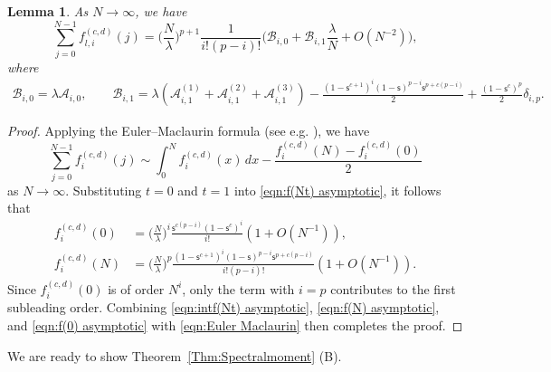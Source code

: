 \documentclass{amsart}
\theoremstyle{plain}
\newtheorem{lem}[thm]{Lemma}
\theoremstyle{remark}
\numberwithin{equation}{section}
\begin{document}
\begin{lem}\label{lem:asymptotic of sum f_{l,i}}
    As $N\rightarrow\infty$, we have
    \begin{equation}
        \sum_{j=0}^{N-1}f_{l,i}^{(c,d)}(j)
        =\Big(\frac{N}{\lambda}\Big)^{p+1}\frac{1}{i!(p-i)!}\Big(\mathcal {B}_{i,0}+\mathcal{B}_{i,1}\frac{\lambda}{N}+O(N^{-2})\Big), 
    \end{equation}
    where 
     \begin{align} \label{def of mathcal Bi01}
        \mathcal{B}_{i,0}=\lambda\mathcal{A}_{i,0},\qquad 
\mathcal{B}_{i,1}=\lambda(\mathcal{A}_{i,1}^{(1)}+\mathcal{A}_{i,1}^{(2)}+\mathcal{A}_{i,1}^{(3)}) -\frac{(1-\mathsf{s}^{c+1})^{i}(1-\mathsf{s})^{p-i}\mathsf{s}^{p+c(p-i)} }{2}+\frac{(1-\mathsf{s}^{c})^{p}}{2}\delta_{i,p}.
    \end{align}  
\end{lem}

\begin{proof}
    Applying the Euler–Maclaurin formula (see e.g. \cite[Section 2.10]{NIST}), we have 
    \begin{equation}\label{eqn:Euler Maclaurin}
        \sum_{j=0}^{N-1}f_{i}^{(c,d)}(j)\sim\int_{0}^{N}f_{i}^{(c,d)}(x)\,dx-\frac{f_{i}^{(c,d)}(N)-f_{i}^{(c,d)}(0)}{2}
    \end{equation}
    as $N\rightarrow\infty$. Substituting $t=0$ and $t=1$ into \eqref{eqn:f(Nt) asymptotic}, it follows that 
    \begin{align}
    \label{eqn:f(0) asymptotic}
        f_{i}^{(c,d)}(0)&=\Big(\frac{N}{\lambda}\Big)^{i}\frac{\mathsf{s}^{c(p-i)}(1-\mathsf{s}^{c})^{i}}{i!}(1+O(N^{-1})),
        \\
        \label{eqn:f(N) asymptotic}
        f_{i}^{(c,d)}(N)&=\Big(\frac{N}{\lambda}\Big)^{p}\frac{(1-\mathsf{s}^{c+1})^{i}(1-\mathsf{s})^{p-i}\mathsf{s}^{p+c(p-i)}}{i!(p-i)!}(1+O(N^{-1})).
    \end{align} 
  Since $f_{i}^{(c,d)}(0)$ is of order $N^{i}$, only the term with $i=p$ 
contributes to the first subleading order. Combining 
\eqref{eqn:intf(Nt) asymptotic}, \eqref{eqn:f(N) asymptotic}, and 
\eqref{eqn:f(0) asymptotic} with \eqref{eqn:Euler Maclaurin} 
then completes the proof.
\end{proof}
 

We are ready to show Theorem~\ref{Thm:Spectralmoment} (B). 
\end{document}
